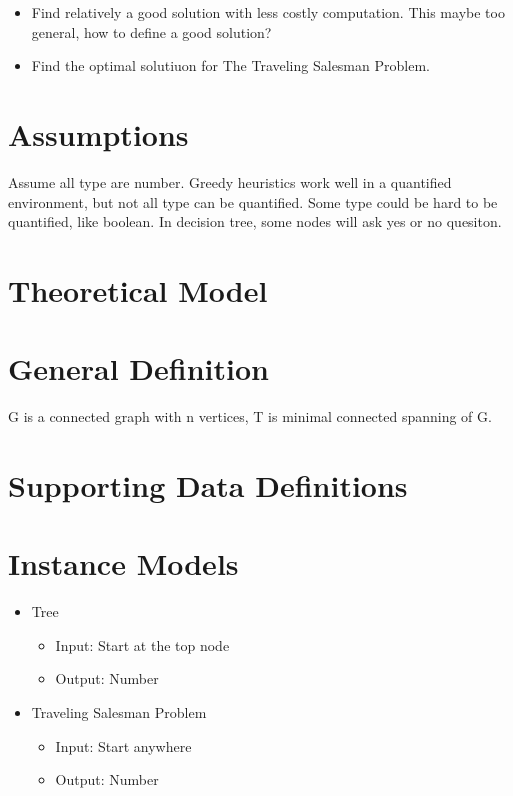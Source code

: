 \documentclass[12pt]{article}
\begin{document}
\begin{itemize}
    \item Find relatively a good solution with less costly computation. 
    This maybe too general, how to define a good solution?
    \item Find the optimal solutiuon for The Traveling Salesman Problem.
\end{itemize}

\section{Assumptions}
Assume all type are number.
Greedy heuristics work well in a quantified environment, but not all type can be quantified.
Some type could be hard to be quantified, like boolean. 
In decision tree, some nodes will ask yes or no quesiton.

\section{Theoretical Model}
\section{General Definition}
G is a connected graph with n vertices, T is minimal connected spanning of G.
\section{Supporting Data Definitions}

\section{Instance Models}
\begin{itemize}
    \item Tree
    \begin{itemize}
        \item Input: Start at the top node
        \item Output: Number
    \end{itemize}
    \item Traveling Salesman Problem
    \begin{itemize}
        \item Input: Start anywhere
        \item Output: Number
    \end{itemize}
\end{itemize}
\end{document}
